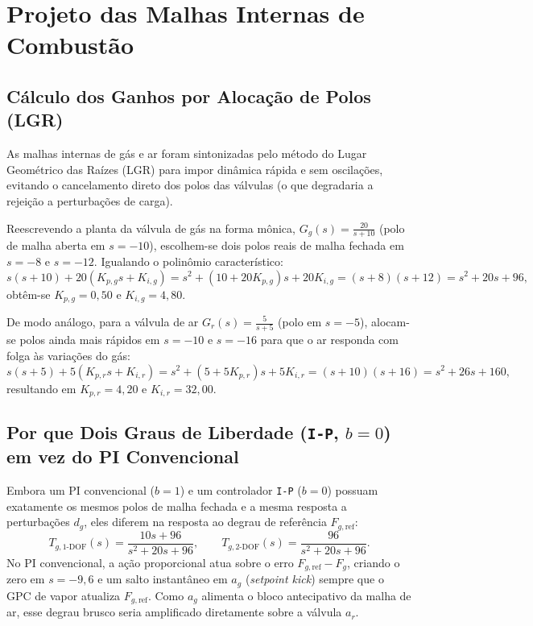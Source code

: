 \documentclass[12pt,a4paper]{article}
\begin{document}
\section{Projeto das Malhas Internas de Combust\~ao}

\subsection{C\'alculo dos Ganhos por Aloca\c{c}\~ao de Polos (LGR)}
As malhas internas de g\'as e ar foram sintonizadas pelo m\'etodo do Lugar Geom\'etrico das Ra\'izes (LGR) para impor din\^amica r\'apida e sem oscila\c{c}\~oes, evitando o cancelamento direto dos polos das v\'alvulas (o que degradaria a rejei\c{c}\~ao a perturba\c{c}\~oes de carga).

Reescrevendo a planta da v\'alvula de g\'as na forma m\^onica, $G_g(s) = \frac{20}{s + 10}$ (polo de malha aberta em $s = -10$), escolhem-se dois polos reais de malha fechada em $s = -8$ e $s = -12$. Igualando o polin\^omio caracter\'istico:
\begin{equation}
    s(s + 10) + 20(K_{p,g} s + K_{i,g}) = s^2 + (10 + 20 K_{p,g})s + 20 K_{i,g} = (s + 8)(s + 12) = s^2 + 20s + 96,
\end{equation}
obt\^em-se $K_{p,g} = 0{,}50$ e $K_{i,g} = 4{,}80$.

De modo an\'alogo, para a v\'alvula de ar $G_r(s) = \frac{5}{s + 5}$ (polo em $s = -5$), alocam-se polos ainda mais r\'apidos em $s = -10$ e $s = -16$ para que o ar responda com folga \`as varia\c{c}\~oes do g\'as:
\begin{equation}
    s(s + 5) + 5(K_{p,r} s + K_{i,r}) = s^2 + (5 + 5 K_{p,r})s + 5 K_{i,r} = (s + 10)(s + 16) = s^2 + 26s + 160,
\end{equation}
resultando em $K_{p,r} = 4{,}20$ e $K_{i,r} = 32{,}00$.

\subsection{Por que Dois Graus de Liberdade (\texttt{I-P}, \texorpdfstring{$b = 0$}{b = 0}) em vez do PI Convencional}
Embora um PI convencional ($b = 1$) e um controlador \texttt{I-P} ($b = 0$) possuam exatamente os mesmos polos de malha fechada e a mesma resposta a perturba\c{c}\~oes $d_g$, eles diferem na resposta ao degrau de refer\^encia $F_{g,\text{ref}}$:
\begin{equation}
    T_{g,\text{1-DOF}}(s) = \frac{10s + 96}{s^2 + 20s + 96}, \qquad T_{g,\text{2-DOF}}(s) = \frac{96}{s^2 + 20s + 96}.
\end{equation}
No PI convencional, a a\c{c}\~ao proporcional atua sobre o erro $F_{g,\text{ref}} - F_g$, criando o zero em $s = -9{,}6$ e um salto instant\^aneo em $a_g$ (\textit{setpoint kick}) sempre que o GPC de vapor atualiza $F_{g,\text{ref}}$. Como $a_g$ alimenta o bloco antecipativo da malha de ar, esse degrau brusco seria amplificado diretamente sobre a v\'alvula $a_r$.
\end{document}
